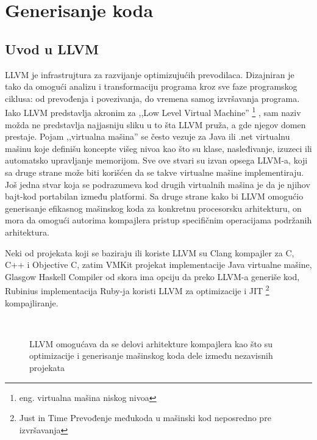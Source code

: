 \chapter{Generisanje koda}
\label{ch:generisanje} 
\section{Uvod u LLVM}

LLVM je infrastrujtura za razvijanje optimizujućih prevodilaca. Dizajniran je tako da omogući analizu i transformaciju programa kroz sve faze programskog ciklusa: od prevođenja i povezivanja, do vremena samog izvršavanja programa\cite{llvm-cgo04}. 
Iako LLVM predstavlja akronim za ,,Low Level Virtual Machine''
\footnote{eng. virtualna mašina niskog nivoa}
, sam naziv možda ne predstavlja najjasniju sliku u to šta LLVM pruža, a gde njegov domen prestaje. 
Pojam ,,virtualna mašina'' se često vezuje za Java ili .net virtualnu mašinu koje definišu koncepte višeg nivoa kao što su klase, nasleđivanje, izuzeci ili automatsko upravljanje memorijom. 
Sve ove stvari su izvan opsega LLVM-a, koji sa druge strane može biti korišćen da se takve virtualne mašine implementiraju. 
Još jedna stvar koja se podrazumeva kod drugih virtualnih mašina je da je njihov bajt-kod portabilan između platformi. 
Sa druge strane kako bi LLVM omogućio generisanje efikasnog mašinskog koda za konkretnu procesorsku arhitekturu, on mora da omogući autorima kompajlera pristup specifičnim operacijama podržanih arhitektura. 

Neki od projekata koji se baziraju ili koriste LLVM su Clang \ndash kompajler za C, C++ i Objective C, 
zatim VMKit projekat implementacije Java virtualne mašine, 
Glasgow Haskell Compiler od skora ima opciju da preko LLVM-a generiše kod, 
Rubinius implementacija Ruby-ja koristi LLVM za optimizacije i JIT
\footnote{\skr \eng Just in Time \ndash Prevođenje međukoda u mašinski kod neposredno pre izvršavanja} 
kompajliranje.

\begin{figure}[h]

\centering
{} \\

\caption{LLVM omogućava da se delovi arhitekture kompajlera kao što su optimizacije i generisanje mašinskog koda dele između nezavisnih projekata}
\end{figure}

